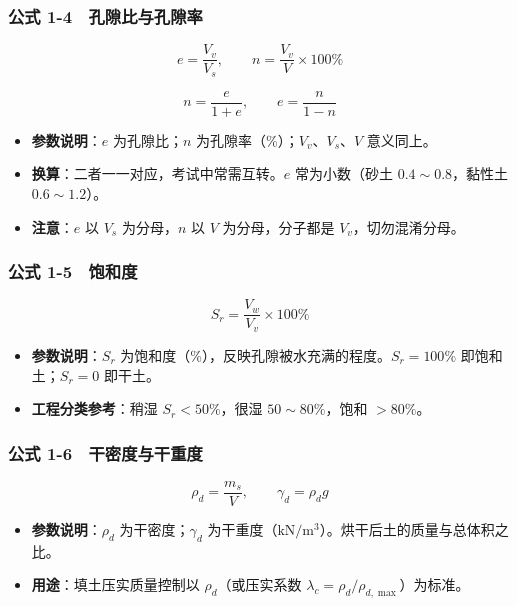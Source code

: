 \documentclass[
]{article}
\providecommand{\tightlist}{%
  \setlength{\itemsep}{0pt}\setlength{\parskip}{0pt}}
\begin{document}
\subsubsection{公式
1-4　孔隙比与孔隙率}\label{ux516cux5f0f-1-4-ux5b54ux9699ux6bd4ux4e0eux5b54ux9699ux7387}

\[e=\frac{V_v}{V_s},\qquad n=\frac{V_v}{V}\times100\%\]

\[n=\frac{e}{1+e},\qquad e=\frac{n}{1-n}\]

\begin{itemize}
\tightlist
\item
  \textbf{参数说明}：\(e\) 为孔隙比；\(n\)
  为孔隙率（\%）；\(V_v\)、\(V_s\)、\(V\) 意义同上。
\item
  \textbf{换算}：二者一一对应，考试中常需互转。\(e\) 常为小数（砂土
  \(0.4\sim0.8\)，黏性土 \(0.6\sim1.2\)）。
\item
  \textbf{注意}：\(e\) 以 \(V_s\) 为分母，\(n\) 以 \(V\)
  为分母，分子都是 \(V_v\)，切勿混淆分母。
\end{itemize}

\subsubsection{公式
1-5　饱和度}\label{ux516cux5f0f-1-5-ux9971ux548cux5ea6}

\[S_r=\frac{V_w}{V_v}\times100\%\]

\begin{itemize}
\tightlist
\item
  \textbf{参数说明}：\(S_r\)
  为饱和度（\%），反映孔隙被水充满的程度。\(S_r=100\%\)
  即饱和土；\(S_r=0\) 即干土。
\item
  \textbf{工程分类参考}：稍湿 \(S_r<50\%\)，很湿 \(50\sim80\%\)，饱和
  \(>80\%\)。
\end{itemize}

\subsubsection{公式
1-6　干密度与干重度}\label{ux516cux5f0f-1-6-ux5e72ux5bc6ux5ea6ux4e0eux5e72ux91cdux5ea6}

\[\rho_d=\frac{m_s}{V},\qquad \gamma_d=\rho_d g\]

\begin{itemize}
\tightlist
\item
  \textbf{参数说明}：\(\rho_d\) 为干密度；\(\gamma_d\)
  为干重度（\(\mathrm{kN/m^3}\)）。烘干后土的质量与总体积之比。
\item
  \textbf{用途}：填土压实质量控制以 \(\rho_d\)（或压实系数
  \(\lambda_c=\rho_d/\rho_{d,\max}\)）为标准。
\end{itemize}
\end{document}
